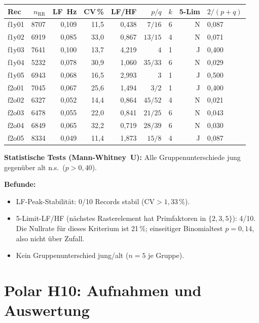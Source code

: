 \begin{center}
\begin{tabular}{@{}lrrrrrrrl@{}}
\toprule
Rec & $n_\text{RR}$ & LF~Hz & CV\,\% & LF/HF & $p/q$ & $k$ & 5-Lim & $2/(p+q)$ \\
\midrule
f1y01 & 8707 & 0{,}109 & 11{,}5 & 0{,}438 & $7/16$ & 6 & N & 0{,}087 \\
f1y02 & 6919 & 0{,}085 & 33{,}0 & 0{,}867 & $13/15$ & 4 & N & 0{,}071 \\
f1y03 & 7641 & 0{,}100 & 13{,}7 & 4{,}219 & $4$ & 1 & J & 0{,}400 \\
f1y04 & 5232 & 0{,}078 & 30{,}9 & 1{,}060 & $35/33$ & 6 & N & 0{,}029 \\
f1y05 & 6943 & 0{,}068 & 16{,}5 & 2{,}993 & $3$ & 1 & J & 0{,}500 \\
\midrule
f2o01 & 7045 & 0{,}067 & 25{,}6 & 1{,}494 & $3/2$ & 1 & J & 0{,}400 \\
f2o02 & 6327 & 0{,}052 & 14{,}4 & 0{,}864 & $45/52$ & 4 & N & 0{,}021 \\
f2o03 & 6478 & 0{,}055 & 22{,}0 & 0{,}841 & $21/25$ & 6 & N & 0{,}043 \\
f2o04 & 6849 & 0{,}065 & 32{,}2 & 0{,}719 & $28/39$ & 6 & N & 0{,}030 \\
f2o05 & 8334 & 0{,}049 & 11{,}4 & 1{,}873 & $15/8$ & 4 & J & 0{,}087 \\
\bottomrule
\end{tabular}
\end{center}

\textbf{Statistische Tests (Mann-Whitney~U):} Alle Gruppenunterschiede
jung gegenüber alt n.s.\ ($p>0{,}40$).

\textbf{Befunde:}
\begin{itemize}
\item LF-Peak-Stabilität: 0/10 Records stabil ($\text{CV}>1{,}33\,\%$).
\item 5-Limit-LF/HF (nächstes Rasterelement hat Primfaktoren in $\{2,3,5\}$):
  4/10. Die Nullrate für dieses Kriterium ist 21\,\%; einseitiger
  Binomialtest $p=0{,}14$, also nicht über Zufall.
\item Kein Gruppenunterschied jung/alt ($n=5$ je Gruppe).
\end{itemize}

\section{Polar H10: Aufnahmen und Auswertung}

